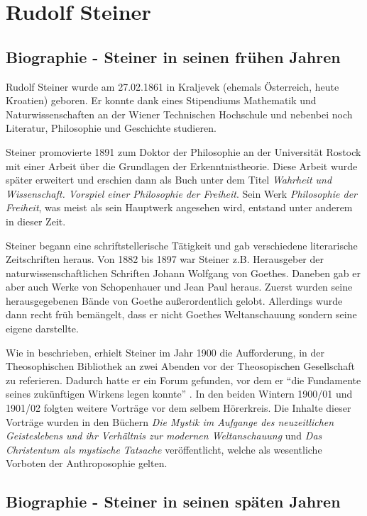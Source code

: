 \section{Rudolf Steiner}
\subsection{Biographie - Steiner in seinen frühen Jahren}
Rudolf Steiner wurde am 27.02.1861 in Kraljevek (ehemals Österreich, heute Kroatien) geboren. Er konnte dank eines Stipendiums Mathematik und Naturwissenschaften an der Wiener Technischen Hochschule und nebenbei noch Literatur, Philosophie und Geschichte studieren. \citep[Vgl.][]{wikipedia}

Steiner promovierte 1891 zum Doktor der Philosophie an der Universität Rostock mit einer Arbeit über die Grundlagen der Erkenntnistheorie. Diese Arbeit wurde später erweitert und erschien dann als Buch unter dem Titel \emph{Wahrheit und Wissenschaft. Vorspiel einer Philosophie der Freiheit}. Sein Werk \emph{Philosophie der Freiheit}, was meist als sein Hauptwerk angesehen wird, entstand unter anderem in dieser Zeit. \citep[Vgl.][]{steiner}

Steiner begann eine schriftstellerische Tätigkeit und gab verschiedene literarische Zeitschriften heraus. Von 1882 bis 1897 war Steiner z.B. Herausgeber der naturwissenschaftlichen Schriften Johann Wolfgang von Goethes. Daneben gab er aber auch Werke von Schopenhauer und Jean Paul heraus. Zuerst wurden seine herausgegebenen Bände von Goethe außerordentlich gelobt. Allerdings wurde dann recht früh bemängelt, dass er nicht Goethes Weltanschauung sondern seine eigene darstellte. \citep[Vgl.][]{steiner, wikipedia}

Wie in \citet{hemleben63} beschrieben, erhielt Steiner im Jahr 1900 die Aufforderung, in der Theosophischen Bibliothek an zwei Abenden vor der Theosopischen Gesellschaft zu referieren. Dadurch hatte er ein Forum gefunden, vor dem er \enquote{die Fundamente seines zukünftigen Wirkens legen konnte} . In den beiden Wintern 1900/01 und 1901/02 folgten weitere Vorträge vor dem selbem Hörerkreis. Die Inhalte dieser Vorträge wurden in den Büchern \emph{Die Mystik im Aufgange des neuzeitlichen Geisteslebens und ihr Verhältnis zur modernen Weltanschauung} und \emph{Das Christentum als mystische Tatsache} veröffentlicht, welche als wesentliche Vorboten der Anthroposophie gelten.

\subsection{Biographie - Steiner in seinen späten Jahren} %
\label{sub:biographie_steiner_in_seinen_sp_ten_jahren}

